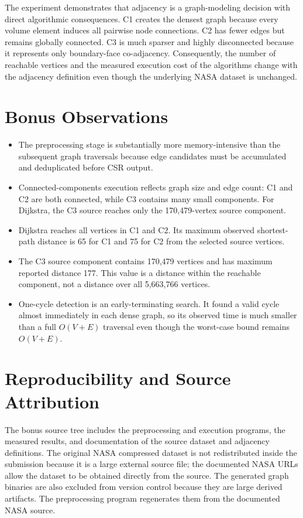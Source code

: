 \documentclass[11pt]{article}
\begin{document}
The experiment demonstrates that adjacency is a graph-modeling decision with direct algorithmic consequences. C1 creates the densest graph because every volume element induces all pairwise node connections. C2 has fewer edges but remains globally connected. C3 is much sparser and highly disconnected because it represents only boundary-face co-adjacency. Consequently, the number of reachable vertices and the measured execution cost of the algorithms change with the adjacency definition even though the underlying NASA dataset is unchanged.

\section{Bonus Observations}
\begin{itemize}
    \item The preprocessing stage is substantially more memory-intensive than the subsequent graph traversals because edge candidates must be accumulated and deduplicated before CSR output.
    \item Connected-components execution reflects graph size and edge count: C1 and C2 are both connected, while C3 contains many small components. For Dijkstra, the C3 source reaches only the 170,479-vertex source component.
    \item Dijkstra reaches all vertices in C1 and C2. Its maximum observed shortest-path distance is 65 for C1 and 75 for C2 from the selected source vertices.
    \item The C3 source component contains 170,479 vertices and has maximum reported distance 177. This value is a distance within the reachable component, not a distance over all 5,663,766 vertices.
    \item One-cycle detection is an early-terminating search. It found a valid cycle almost immediately in each dense graph, so its observed time is much smaller than a full $O(V+E)$ traversal even though the worst-case bound remains $O(V+E)$.
\end{itemize}

\section{Reproducibility and Source Attribution}
The bonus source tree includes the preprocessing and execution programs, the measured results, and documentation of the source dataset and adjacency definitions. The original NASA compressed dataset is not redistributed inside the submission because it is a large external source file; the documented NASA URLs allow the dataset to be obtained directly from the source. The generated graph binaries are also excluded from version control because they are large derived artifacts. The preprocessing program regenerates them from the documented NASA source.
\end{document}
